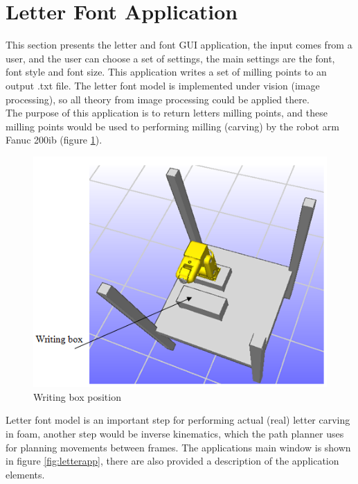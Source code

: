\section{Letter Font Application}
\label{sec:font}
This section presents the letter and font GUI application, the input comes from a user, and the user can choose a set of settings, the main settings are the font, font style and font size. This application writes a set of milling points to an output .txt file. The letter font model is implemented under vision (image processing), so all theory from image processing could be applied there.\\
The purpose of this application is to return letters milling points, and these milling points would be used to performing milling (carving) by the robot arm Fanuc 200ib (figure \ref{fig:writingbox}).

\begin{figure}[H]
  \centering
  \includegraphics[scale= 1]{source/writingbox.png}
  \caption{Writing box position}
  \label{fig:writingbox}
\end{figure}

Letter font model is an important step for performing actual (real) letter carving in foam, another step would be inverse kinematics, which the path planner uses for planning movements between frames. The applications main window is shown in figure  \ref{fig:letterapp}, there are also provided a description of the application elements.

